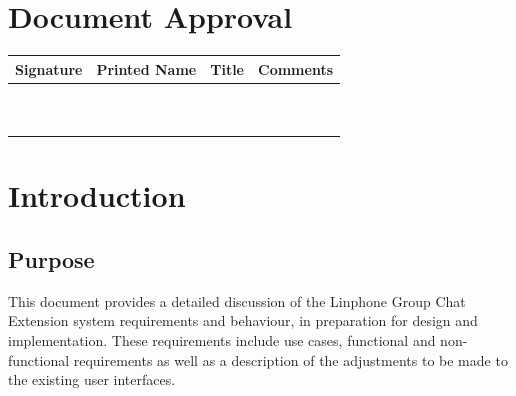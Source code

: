 \documentclass[11pt]{article}
\begin{document}
\section{Document Approval}
\begin{table}[h]
\begin{tabular}{llll}
\textbf{Signature}     & \textbf{Printed Name} & \textbf{Title}        & \textbf{Comments}     \\ \hline
\multicolumn{1}{|l|}{} & \multicolumn{1}{L{4.5cm}|}{} & \multicolumn{1}{L{4cm}|}{} & \multicolumn{1}{L{4cm}|}{} \\ \hline
\multicolumn{1}{|l|}{} & \multicolumn{1}{l|}{} & \multicolumn{1}{l|}{} & \multicolumn{1}{l|}{} \\ \hline
\multicolumn{1}{|l|}{} & \multicolumn{1}{l|}{} & \multicolumn{1}{l|}{} & \multicolumn{1}{l|}{} \\ \hline
\multicolumn{1}{|l|}{} & \multicolumn{1}{l|}{} & \multicolumn{1}{l|}{} & \multicolumn{1}{l|}{} \\ \hline
\multicolumn{1}{|l|}{} & \multicolumn{1}{l|}{} & \multicolumn{1}{l|}{} & \multicolumn{1}{l|}{} \\ \hline
\multicolumn{1}{|l|}{} & \multicolumn{1}{l|}{} & \multicolumn{1}{l|}{} & \multicolumn{1}{l|}{} \\ \hline
\multicolumn{1}{|l|}{} & \multicolumn{1}{l|}{} & \multicolumn{1}{l|}{} & \multicolumn{1}{l|}{} \\ \hline
\multicolumn{1}{|l|}{} & \multicolumn{1}{l|}{} & \multicolumn{1}{l|}{} & \multicolumn{1}{l|}{} \\ \hline
\multicolumn{1}{|l|}{} & \multicolumn{1}{l|}{} & \multicolumn{1}{l|}{} & \multicolumn{1}{l|}{} \\ \hline
\multicolumn{1}{|l|}{} & \multicolumn{1}{l|}{} & \multicolumn{1}{l|}{} & \multicolumn{1}{l|}{} \\ \hline
\end{tabular}
\end{table}

\newpage
\section{Introduction}

\subsection{Purpose}
This document provides a detailed discussion of the Linphone Group Chat Extension system requirements and behaviour, in preparation for design and implementation. These requirements include use cases, functional and non-functional requirements as well as a description of the adjustments to be made to the existing user interfaces.
\end{document}
